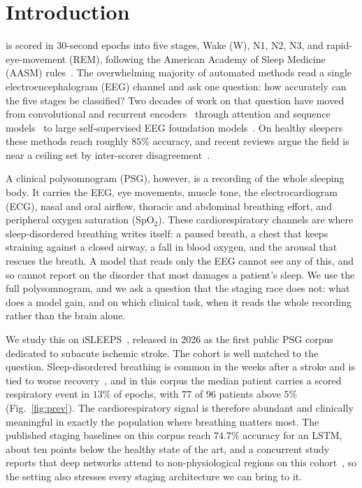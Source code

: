 \documentclass[journal]{IEEEtran}
\begin{document}
\section{Introduction}
 is scored in 30-second epochs into five stages, Wake (W), N1, N2,
N3, and rapid-eye-movement (REM), following the American Academy of Sleep Medicine (AASM)
rules~\cite{aasm2023manual}. The overwhelming majority of automated methods read a single
electroencephalogram (EEG) channel and ask one question: how accurately can the five stages
be classified? Two decades of work on that question have moved from convolutional and
recurrent encoders~\cite{supratak2017deepsleepnet,phan2019seqsleepnet,supratak2020tinysleepnet}
through attention and sequence models~\cite{eldele2021attnsleep,phan2021xsleepnet,
perslev2019utime} to large self-supervised EEG foundation
models~\cite{labram2024,cbramod2025,eegpt2024,biot2023}. On healthy sleepers these methods
reach roughly $85\%$ accuracy, and recent reviews argue the field is near a ceiling set by
inter-scorer disagreement~\cite{phan2022survey}.

A clinical polysomnogram (PSG), however, is a recording of the whole sleeping body. It
carries the EEG, eye movements, muscle tone, the electrocardiogram (ECG), nasal and oral
airflow, thoracic and abdominal breathing effort, and peripheral oxygen saturation
(SpO$_2$). These cardiorespiratory channels are where sleep-disordered breathing writes
itself: a paused breath, a chest that keeps straining against a closed airway, a fall in
blood oxygen, and the arousal that rescues the breath. A model that reads only the EEG
cannot see any of this, and so cannot report on the disorder that most damages a patient's
sleep. We use the full polysomnogram, and we ask a question that the staging race does not:
what does a model gain, and on which clinical task, when it reads the whole recording rather
than the brain alone.

We study this on iSLEEPS~\cite{maiti2026isleeps}, released in 2026 as the first public PSG
corpus dedicated to subacute ischemic stroke. The cohort is well matched to the question.
Sleep-disordered breathing is common in the weeks after a stroke and is tied to worse
recovery~\cite{bassetti2006sleep,denis2024sleep}, and in this corpus the median patient
carries a scored respiratory event in $13\%$ of epochs, with $77$ of $96$ patients above
$5\%$ (Fig.~\ref{fig:prev}). The cardiorespiratory signal is therefore abundant and
clinically meaningful in exactly the population where breathing matters most. The published
staging baselines on this corpus reach $74.7\%$ accuracy for an LSTM, about ten points below
the healthy state of the art, and a concurrent study reports that deep networks attend to
non-physiological regions on this cohort~\cite{bose2026gap}, so the setting also stresses
every staging architecture we can bring to it.
\end{document}
